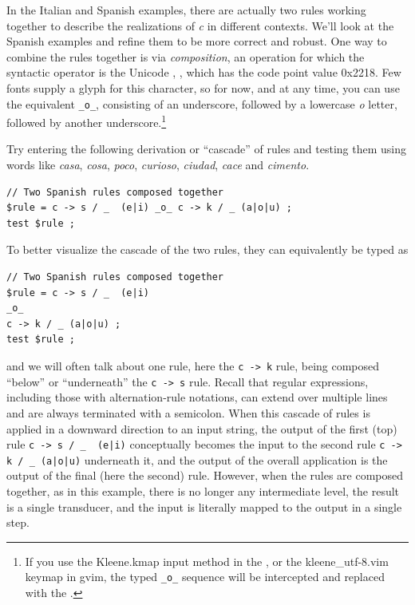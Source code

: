 In the Italian and Spanish examples, there are actually two rules working together to describe the realizations of
\emph{c} in different contexts.  We'll look at the Spanish examples and refine them to be more correct and robust.  One
way to combine the rules together is via \emph{composition}, an
operation for which the syntactic 
operator is the Unicode , \ringop{}, which
has the code point value 0x2218.  Few fonts supply a glyph for this
character, so for now, and at any time, you can use
the  equivalent \verb!_o_!, consisting of an
underscore, followed by a lowercase \emph{o} letter, followed by another underscore.\footnote{If you use the
	Kleene.kmap input method in the , or the kleene\_utf-8.vim
	keymap in gvim, the typed \verb!_o_! sequence will be
intercepted and replaced with the  \ringop{}.}

Try entering the following derivation or ``cascade'' of rules and testing them using words like \emph{casa},
\emph{cosa}, \emph{poco}, \emph{curioso}, \emph{ciudad}, \emph{cace} and \emph{cimento}.


\begin{Verbatim}
// Two Spanish rules composed together
$rule = c -> s / _  (e|i) _o_ c -> k / _ (a|o|u) ;
test $rule ;
\end{Verbatim}

\noindent
To better visualize the cascade of the two rules, they can equivalently be typed as

\begin{Verbatim}
// Two Spanish rules composed together
$rule = c -> s / _  (e|i) 
_o_ 
c -> k / _ (a|o|u) ;
test $rule ;
\end{Verbatim}

\noindent
and we will often talk about one rule, here the \texttt{c -> k} rule,
being composed ``below'' or
``underneath'' the \texttt{c -> s} rule.  Recall that regular
expressions, including those with alternation-rule notations, can extend
over multiple lines and are always terminated with a semicolon.  When this cascade of rules is applied in a downward direction to an input
string, the output of the first (top) rule \verb!c -> s / _  (e|i)!
conceptually becomes the input to the second rule
\verb!c -> k / _ (a|o|u)!
underneath it, and the output of the overall application is the output of the
final (here the second) rule.  However, when the rules are composed
together, as in this example, there is no longer any intermediate level,
the result is a single transducer, and the input is literally mapped to the output
in a single step.

